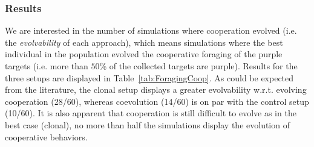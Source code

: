  \begin{table}[hbtp]
    \caption{Rewards for the foraging of the different targets, depending on whether they were collected alone or cooperatively.}
    \label{tab:Rewards}
  \end{table}

  \subsubsection{Results}

  \begin{table}[hbtp]
    \caption{Number of simulations where the best individual evolved a cooperative strategy (collecting purple targets) or a solitary strategy (collecting green targets) for each setup in the foraging task.}
    \label{tab:ForagingCoop}
  \end{table}

  We are interested in the number of simulations where cooperation evolved (i.e. the \emph{evolvability} of each approach), which means simulations where the best individual in the population evolved the cooperative foraging of the purple targets (i.e. more than $50$\% of the collected targets are purple). Results for the three setups are displayed in Table~\ref{tab:ForagingCoop}. As could be expected from the literature, the clonal setup displays a greater evolvability w.r.t. evolving cooperation (28/60), whereas coevolution (14/60) is on par with the control setup (10/60). It is also apparent that cooperation is still difficult to evolve as in the best case (clonal), no more than half the simulations display the evolution of cooperative behaviors.

